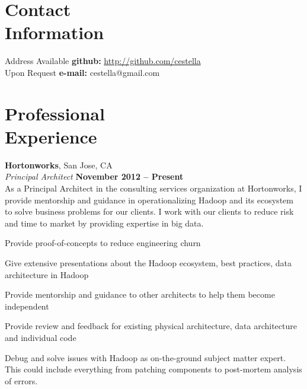 \documentclass[margin,line,12pt]{resume}
\begin{document}
\begin{resume}
    \thispagestyle{empty}
    \section{\mysidestyle Contact\\Information}

    Address Available             \hfill {\bf github:} \url{http://github.com/cestella} \vspace{0mm}\\\vspace{0mm}%
    Upon Request                  \hfill {\bf e-mail:} cestella@gmail.com       \vspace{0mm}\\\vspace{-4.5mm}%

    \section{\mysidestyle Professional\\Experience}
    \textbf{Hortonworks}, San Jose, CA \vspace{2mm}\\\vspace{1mm}%
    \textsl{Principal Architect} \hfill \textbf{November 2012 -- Present}\\
    As a Principal Architect in the consulting services organization at Hortonworks, I provide
    mentorship and guidance in operationalizing Hadoop and its ecosystem to solve business problems
    for our clients.  I work with our clients to reduce risk and time to market by providing expertise 
    in big data.

    \begin{list2}
    \item  Provide proof-of-concepts to reduce engineering churn
    \item  Give extensive presentations about the Hadoop ecosystem, best practices, data architecture in Hadoop
    \item  Provide mentorship and guidance to other architects to help them become independent
    \item  Provide review and feedback for existing physical architecture, data architecture and individual code
    \item  Debug and solve issues with Hadoop as on-the-ground subject matter expert.  This could include everything from patching components to post-mortem analysis of errors.
    \end{list2}


\end{resume}
\end{document}
